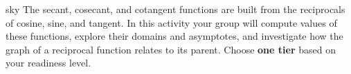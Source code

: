 \documentclass[10pt]{article}
\begin{document}
\namepartnerperiod

\vspace{0.10in}

\begin{scenariobox}{sky}
The secant, cosecant, and cotangent functions are built from the reciprocals
of cosine, sine, and tangent. In this activity your group will compute values
of these functions, explore their domains and asymptotes, and investigate
how the graph of a reciprocal function relates to its parent. Choose
\textbf{one tier} based on your readiness level.
\end{scenariobox}

\vspace{0.08in}
\end{document}
